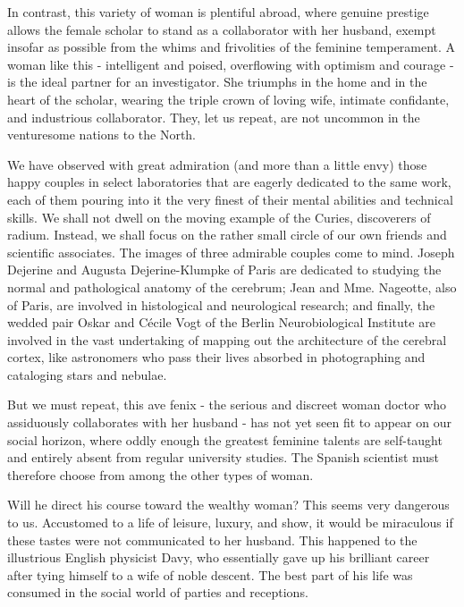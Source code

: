 \documentclass{article}
\begin{document}
In contrast, this variety of woman is plentiful abroad, where genuine prestige allows the female scholar to stand as a collaborator with her husband, exempt insofar as possible from the whims and frivolities of the feminine temperament. A woman like this - intelligent and poised, overflowing with optimism and courage - is the ideal partner for an investigator. She triumphs in the home and in the heart of the scholar, wearing the triple crown of loving wife, intimate confidante, and industrious collaborator. They, let us repeat, are not uncommon in the venturesome nations to the North.

We have observed with great admiration (and more than a little envy) those happy couples in select laboratories that are eagerly dedicated to the same work, each of them pouring into it the very finest of their mental abilities and technical skills. We shall not dwell on the moving example of the Curies, discoverers of radium. Instead, we shall focus on the rather small circle of our own friends and scientific associates. The images of three admirable couples come to mind. Joseph Dejerine and Augusta Dejerine-Klumpke of Paris are dedicated to studying the normal and pathological anatomy of the cerebrum; Jean and Mme. Nageotte, also of Paris, are involved in histological and neurological research; and finally, the wedded pair Oskar and Cécile Vogt of the Berlin Neurobiological Institute are involved in the vast undertaking of mapping out the architecture of the cerebral cortex, like astronomers who pass their lives absorbed in photographing and cataloging stars and nebulae.

But we must repeat, this ave fenix - the serious and discreet woman doctor who assiduously collaborates with her husband - has not yet seen fit to appear on our social horizon, where oddly enough the greatest feminine talents are self-taught and entirely absent from regular university studies. The Spanish scientist must therefore choose from among the other types of woman.

Will he direct his course toward the wealthy woman? This seems very dangerous to us. Accustomed to a life of leisure, luxury, and show, it would be miraculous if these tastes were not communicated to her husband. This happened to the illustrious English physicist Davy, who essentially gave up his brilliant career after tying himself to a wife of noble descent. The best part of his life was consumed in the social world of parties and receptions.
\end{document}
